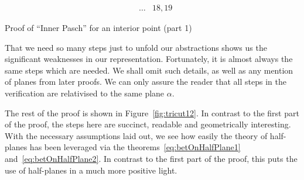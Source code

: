 \begin{boxedfigure}
\begin{align*}
&\ldots & 18,19
\end{align*}
\caption{Proof of ``Inner Pasch'' for an interior point (part 1)}
\label{fig:tricut11}
\end{boxedfigure}

That we need so many steps just to unfold our abstractions shows us the significant weaknesses in our representation. Fortunately, it is almost always the same steps which are needed. We shall omit such details, as well as any mention of planes from later proofs. We can only assure the reader that all steps in the verification are relativised to the same plane $\alpha$.

The rest of the proof is shown in Figure~\ref{fig:tricut12}. In contrast to the first part of the proof, the steps here are succinct, readable and geometrically interesting. With the necessary assumptions laid out, we see how easily the theory of half-planes has been leveraged via the theorems~\ref{eq:betOnHalfPlane1} and~\ref{eq:betOnHalfPlane2}. In contrast to the first part of the proof, this puts the use of half-planes in a much more positive light. 

